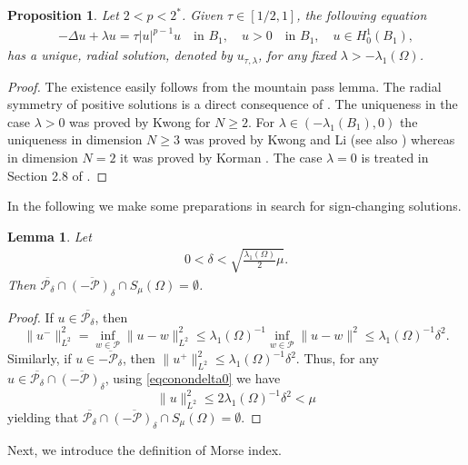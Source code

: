 \documentclass[10pt,a4paper]{article}
\newtheorem{lemma}[theorem]{Lemma}
\newtheorem{proposition}[theorem]{Proposition}
\theoremstyle{definition} \theoremstyle{remark}
\numberwithin{equation}{section}
\newcommand{\p}{\mathcal{P}}
\newcommand{\la}{\lambda}
\begin{document}
\begin{proposition} \label{propuniquefixlaB1}
	Let $2 < p < 2^*$. Given $\tau \in [1/2,1]$, the following equation
	\begin{align} \label{eqwithfixlaB1}
		-\Delta u + \la u = \tau |u|^{p-1}u \quad \text{in } B_1, \quad u > 0 \quad \text{in } B_1, \quad u \in H_0^1(B_1),
	\end{align}
	has a unique, radial solution, denoted by $u_{\tau,\la}$, for any fixed $\la > -\la_1(\Omega)$.
\end{proposition}

\begin{proof}
	The existence easily follows from the mountain pass lemma. The radial symmetry of positive solutions is a direct consequence of \cite{GNN}. The uniqueness in the case $\la > 0$ was proved by Kwong \cite{Kwong} for $N \geq 2$. For $\la \in (-\la_1(B_1),0)$ the uniqueness in dimension $N \ge 3$ was proved by Kwong and Li \cite{KL} (see also \cite{Zhang}) whereas in dimension $N = 2$ it was proved by Korman \cite{Korman}. The case $\la = 0$ is treated in Section 2.8 of \cite{GNN}.
\end{proof}

In the following we make some preparations in search for sign-changing solutions.

\begin{lemma} \label{lemcapnonemp}
	Let
	\begin{align} \label{eqconondelta0}
		0 < \delta < \sqrt{\frac{\la_1(\Omega)}{2}\mu}.
	\end{align}
	Then $\overline{\p_\delta} \cap \overline{(-\p)_\delta} \cap S_\mu(\Omega) = \emptyset$.
\end{lemma}

\begin{proof}
	If $u \in \overline{\p_\delta}$, then
	$$
	\|u^-\|_{L^2}^2 = \inf_{w \in \p}\|u - w\|_{L^2}^2 \leq \la_1(\Omega)^{-1}\inf_{w \in \p}\|u - w\|^2 \leq \la_1(\Omega)^{-1}\delta^2.
	$$
	Similarly, if $u \in \overline{-\p_\delta}$, then $\|u^+\|_{L^2}^2 \leq \la_1(\Omega)^{-1}\delta^2$. Thus, for any $u \in \overline{\p_\delta} \cap \overline{(-\p)_\delta}$, using \eqref{eqconondelta0} we have
	$$
	\|u\|_{L^2}^2 \leq 2\la_1(\Omega)^{-1}\delta^2 < \mu
	$$
	yielding that $\overline{\p_\delta} \cap \overline{(-\p)_\delta} \cap S_\mu(\Omega) = \emptyset$.
\end{proof}

Next, we introduce the definition of Morse index.
\end{document}

